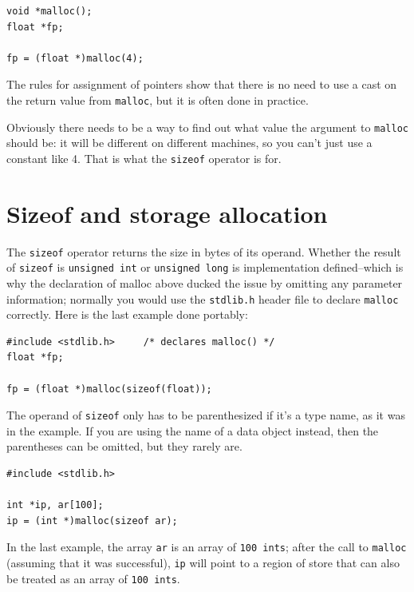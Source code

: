    \begin{Verbatim}
void *malloc();
float *fp;

fp = (float *)malloc(4);
\end{Verbatim}

   The rules for assignment of pointers show that there is no need to use
    a cast on the return value from \texttt{malloc}, but it is often
    done in practice.


   Obviously there needs to be a way to find out what value the argument
    to \texttt{malloc} should be: it will be different on different
    machines, so you can't just use a constant like 4. That is what the
    \texttt{sizeof} operator is for.


  

 
        \section{Sizeof and storage allocation}
        

  

  The \texttt{sizeof} operator returns the size in bytes of its
   operand. Whether the result of \texttt{sizeof} is \texttt{unsigned
   int} or \texttt{unsigned long} is implementation
   defined--which is why the declaration of malloc above ducked the
   issue by omitting any parameter information; normally you would use the
   \texttt{stdlib.h} header file to declare \texttt{malloc}
   correctly. Here is the last example done portably:


  \begin{Verbatim}
#include <stdlib.h>     /* declares malloc() */
float *fp;

fp = (float *)malloc(sizeof(float));
\end{Verbatim}

  The operand of \texttt{sizeof} only has to be parenthesized if it's
   a type name, as it was in the example. If you are using the name of
   a data object instead, then the parentheses can be omitted, but they
   rarely are.


  \begin{Verbatim}
#include <stdlib.h>

int *ip, ar[100];
ip = (int *)malloc(sizeof ar);
\end{Verbatim}

  In the last example, the array \texttt{ar} is an array of \texttt{100
   ints}; after the call to \texttt{malloc} (assuming that it was
   successful), \texttt{ip} will point to a region of store that can
   also be treated as an array of \texttt{100 ints}.


